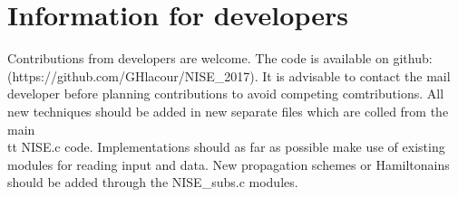 \chapter{Information for developers\label{chap:developers}}
Contributions from developers are welcome. The code is available on
github:\\ (https://github.com/GHlacour/NISE\_2017). It is advisable to contact the mail developer before planning contributions to avoid competing comtributions. All new techniques should be added in new separate files which are colled from the main {\\tt NISE.c} code. Implementations should as far as possible make use of existing modules for reading input and data. New propagation schemes or Hamiltonains should be added through the {NISE\_subs.c} modules.

